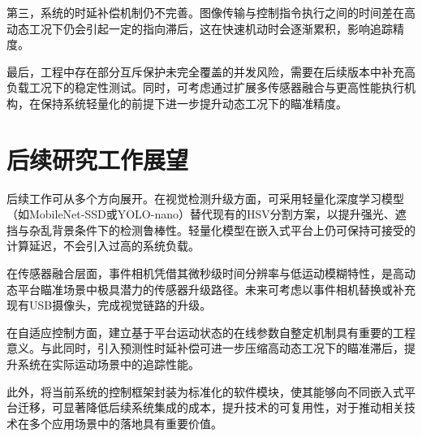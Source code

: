第三，系统的时延补偿机制仍不完善。图像传输与控制指令执行之间的时间差在高动态工况下仍会引起一定的指向滞后，这在快速机动时会逐渐累积，影响追踪精度。

最后，工程中存在部分互斥保护未完全覆盖的并发风险，需要在后续版本中补充高负载工况下的稳定性测试。同时，可考虑通过扩展多传感器融合与更高性能执行机构，在保持系统轻量化的前提下进一步提升动态工况下的瞄准精度。

\section{后续研究工作展望}

后续工作可从多个方向展开。在视觉检测升级方面，可采用轻量化深度学习模型（如MobileNet-SSD或YOLO-nano）替代现有的HSV分割方案，以提升强光、遮挡与杂乱背景条件下的检测鲁棒性。轻量化模型在嵌入式平台上仍可保持可接受的计算延迟，不会引入过高的系统负载。

在传感器融合层面，事件相机凭借其微秒级时间分辨率与低运动模糊特性，是高动态平台瞄准场景中极具潜力的传感器升级路径。未来可考虑以事件相机替换或补充现有USB摄像头，完成视觉链路的升级。

在自适应控制方面，建立基于平台运动状态的在线参数自整定机制具有重要的工程意义。与此同时，引入预测性时延补偿可进一步压缩高动态工况下的瞄准滞后，提升系统在实际运动场景中的追踪性能。

此外，将当前系统的控制框架封装为标准化的软件模块，使其能够向不同嵌入式平台迁移，可显著降低后续系统集成的成本，提升技术的可复用性，对于推动相关技术在多个应用场景中的落地具有重要价值。

